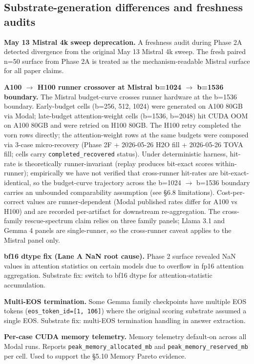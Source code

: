 \documentclass[10pt]{article}
\begin{document}
\subsection{Substrate-generation differences and freshness audits}\label{c-4-substrate-generation-differences}

\textbf{May 13 Mistral 4k sweep deprecation.} A freshness audit during
Phase 2A detected divergence from the original May 13 Mistral 4k sweep.
The fresh paired n=50 surface from Phase 2A is treated as the
mechanism-readable Mistral surface for all paper claims.

\textbf{A100 $\rightarrow$ H100 runner crossover at Mistral b=1024
$\rightarrow$ b=1536 boundary.} The Mistral budget-curve crosses runner
hardware at the b=1536 boundary. Early-budget cells (b=256, 512, 1024)
were generated on A100 80GB via Modal; late-budget attention-weight
cells (b=1536, b=2048) hit CUDA OOM on A100 80GB and were retried on
H100 80GB. The H100 retry completed the vorn rows directly; the
attention-weight rows at the same budgets were composed via 3-case
micro-recovery (Phase 2F + 2026-05-26 H2O fill + 2026-05-26 TOVA fill;
cells carry \texttt{completed\_recovered}
status). Under deterministic harness, hit-rate is theoretically
runner-invariant (replay produces bit-exact scores within-runner);
empirically we have not verified that cross-runner hit-rates are
bit-exact-identical, so the budget-curve trajectory across the b=1024
$\rightarrow$ b=1536 boundary carries an unbounded comparability
assumption (see \S{}6.8 limitations). Cost-per-correct values are
runner-dependent (Modal published rates differ for A100 vs H100) and
are recorded per-artifact for downstream re-aggregation. The
cross-family rescue-spectrum claim relies on three family panels;
Llama 3.1 and Gemma 4 panels are single-runner, so the cross-runner
caveat applies to the Mistral panel only.

\textbf{bf16 dtype fix (Lane A NaN root cause).} Phase 2 surface
revealed NaN values in attention statistics on certain models due to
overflow in fp16 attention aggregation. Substrate fix: switch to bf16
dtype for attention-statistic accumulation.

\textbf{Multi-EOS termination.} Some Gemma family checkpoints have
multiple EOS tokens (\texttt{eos\_token\_id=[1,\ 106]}) where the
original scoring substrate assumed a single EOS. Substrate fix:
multi-EOS termination handling in answer extraction.

\textbf{Per-case CUDA memory telemetry.} Memory telemetry default-on
across all Modal runs. Reports \texttt{peak\_memory\_allocated\_mb} and
\texttt{peak\_memory\_reserved\_mb} per cell. Used to support the \S5.10
Memory Pareto evidence.
\end{document}
